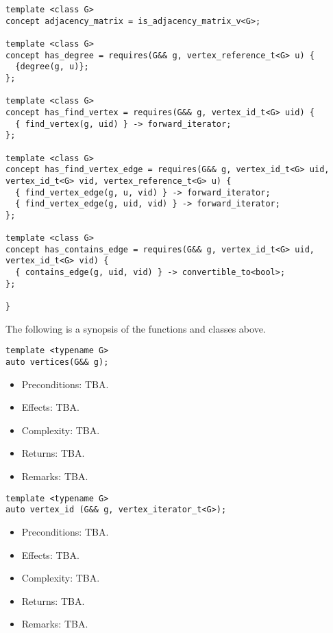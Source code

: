 \documentclass[10pt,onecolumn]{article}
\begin{document}
\begin{lstlisting}
template <class G>
concept adjacency_matrix = is_adjacency_matrix_v<G>;

template <class G>
concept has_degree = requires(G&& g, vertex_reference_t<G> u) {
  {degree(g, u)};
};

template <class G>
concept has_find_vertex = requires(G&& g, vertex_id_t<G> uid) {
  { find_vertex(g, uid) } -> forward_iterator;
};

template <class G>
concept has_find_vertex_edge = requires(G&& g, vertex_id_t<G> uid, vertex_id_t<G> vid, vertex_reference_t<G> u) {
  { find_vertex_edge(g, u, vid) } -> forward_iterator;
  { find_vertex_edge(g, uid, vid) } -> forward_iterator;
};

template <class G>
concept has_contains_edge = requires(G&& g, vertex_id_t<G> uid, vertex_id_t<G> vid) {
  { contains_edge(g, uid, vid) } -> convertible_to<bool>;
};

}
\end{lstlisting}

\vspace{10pt}

\noindent The following is a synopsis of the functions and classes above.

\begin{lstlisting}
template <typename G>
auto vertices(G&& g);
\end{lstlisting}
%
\begin{itemize}
\item Preconditions: TBA.
\item Effects: TBA.
\item Complexity: TBA.
\item Returns: TBA.
\item Remarks: TBA.
\end{itemize}

\vspace{10pt}

\begin{lstlisting}
template <typename G>
auto vertex_id (G&& g, vertex_iterator_t<G>);
\end{lstlisting}
%
\begin{itemize}
\item Preconditions: TBA.
\item Effects: TBA.
\item Complexity: TBA.
\item Returns: TBA.
\item Remarks: TBA.
\end{itemize}
\end{document}
